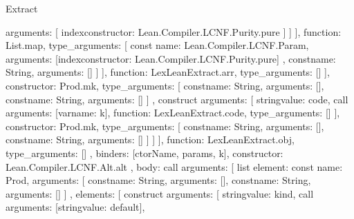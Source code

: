 \begin{lexlean}{Extract}
\begin{toolingmodule}
{{{{{{{{{{{                                      arguments: [
                                        index{constructor: Lean.Compiler.LCNF.Purity.pure}
                                      ]
                                    }
                                  ]
                                }
                              ],
                              function: List.map,
                              type_arguments: [
                                const{
                                  name: Lean.Compiler.LCNF.Param,
                                  arguments: [index{constructor: Lean.Compiler.LCNF.Purity.pure}]
                                },
                                const{name: String, arguments: []}
                              ]
                            }
                          ],
                          function: LexLeanExtract.arr,
                          type_arguments: []
                        }
                      ],
                      constructor: Prod.mk,
                      type_arguments: [
                        const{name: String, arguments: []},
                        const{name: String, arguments: []}
                      ]
                    },
                    construct{
                      arguments: [
                        string{value: code},
                        call{
                          arguments: [var{name: k}],
                          function: LexLeanExtract.code,
                          type_arguments: []
                        }
                      ],
                      constructor: Prod.mk,
                      type_arguments: [
                        const{name: String, arguments: []},
                        const{name: String, arguments: []}
                      ]
                    }
                  ]
                }
              ],
              function: LexLeanExtract.obj,
              type_arguments: []
            },
            binders: [ctorName, params, k],
            constructor: Lean.Compiler.LCNF.Alt.alt
          },
          {
            body: call{
              arguments: [
                list{
                  element: const{
                    name: Prod,
                    arguments: [
                      const{name: String, arguments: []},
                      const{name: String, arguments: []}
                    ]
                  },
                  elements: [
                    construct{
                      arguments: [
                        string{value: kind},
                        call{
                          arguments: [string{value: default}],
}}}}}}}}
\end{toolingmodule}
\end{lexlean}
